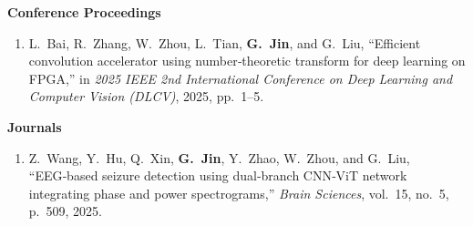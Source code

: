 \documentclass[10pt,a4paper,withhyper]{altacv}
\begin{document}
\textbf{Conference Proceedings}
\begin{enumerate}[leftmargin=0.5cm,label=\raisebox{0pt}{\textcolor{PastelRed}{\large\bfseries\arabic*}},itemsep=0.5em]
  \item L.~Bai, R.~Zhang, W.~Zhou, L.~Tian, \textbf{G.~Jin}, and G.~Liu, ``Efficient convolution accelerator using number‑theoretic transform for deep learning on FPGA,'' in \emph{2025 IEEE 2nd International Conference on Deep Learning and Computer Vision (DLCV)}, 2025, pp.~1–5.
\end{enumerate}

\textbf{Journals}
\begin{enumerate}[leftmargin=0.5cm,label=\raisebox{0pt}{\textcolor{PastelRed}{\large\bfseries\arabic*}},itemsep=0.5em]
  \item Z.~Wang, Y.~Hu, Q.~Xin, \textbf{G.~Jin}, Y.~Zhao, W.~Zhou, and G.~Liu, ``EEG‑based seizure detection using dual‑branch CNN‑ViT network integrating phase and power spectrograms,'' \emph{Brain Sciences}, vol.~15, no.~5, p.~509, 2025.
\end{enumerate}
\end{document}
